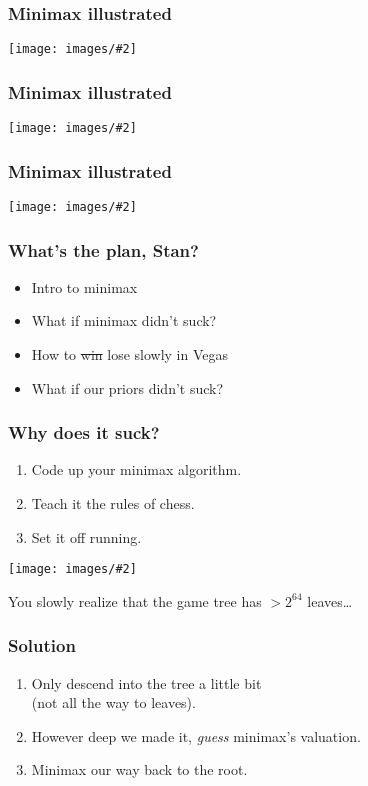 \documentclass[table]{beamer}
\newcommand\img[2]{\texttt{[image: images/\#2]}}
\begin{document}
\begin{frame}
	\frametitle{Minimax illustrated}
	\begin{center}
		\img{1}{games-5.jpg}
	\end{center}
\end{frame}

\begin{frame}
	\frametitle{Minimax illustrated}
	\begin{center}
		\img{1}{games-6.jpg}
	\end{center}
\end{frame}

\begin{frame}
	\frametitle{Minimax illustrated}
	\begin{center}
		\img{1}{games-7.jpg}
	\end{center}
\end{frame}

\begin{frame}
	\frametitle{What's the plan, Stan?}
	\begin{itemize}
		\setlength\itemsep{5ex}
		\item Intro to minimax
		\item \alert{What if minimax didn't suck?}
		\item How to \sout{win} lose slowly in Vegas
		\item What if our priors didn't suck?
	\end{itemize}
\end{frame}

\begin{frame}
	\frametitle{Why does it suck?}
	\begin{enumerate}
		\item Code up your minimax algorithm.
		\item Teach it the rules of chess.
		\item Set it off running.
	\end{enumerate}

	\begin{center}
		\img{0.4}{hourglass.jpg}
	\end{center}

	You slowly realize that the game tree has $>2^{64}$ leaves\ldots
\end{frame}

\begin{frame}
	\frametitle{Solution}
	\begin{enumerate}
		\item Only descend into the tree a little bit\\(not all the way to
			leaves).
		\item However deep we made it, \emph{guess}\footnotemark{} minimax's valuation.
		\item Minimax our way back to the root.
	\end{enumerate}
\end{frame}
\end{document}
